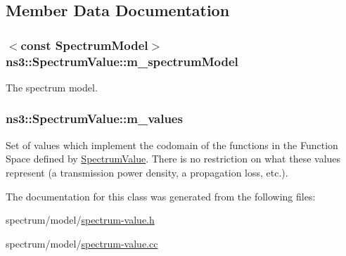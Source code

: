 \subsection{Member Data Documentation}
\subsubsection[{\texorpdfstring{m\+\_\+spectrum\+Model}{m_spectrumModel}}]{$<$const {\bf Spectrum\+Model}$>$ ns3\+::\+Spectrum\+Value\+::m\+\_\+spectrum\+Model\hspace{0.3cm}{\ttfamily [private]}}\hypertarget{classns3_1_1SpectrumValue_ab937e5d66611f1d583e631a4394d40b3}{}\label{classns3_1_1SpectrumValue_ab937e5d66611f1d583e631a4394d40b3}


The spectrum model. 

\subsubsection[{\texorpdfstring{m\+\_\+values}{m_values}}]{ ns3\+::\+Spectrum\+Value\+::m\+\_\+values\hspace{0.3cm}{\ttfamily [private]}}\hypertarget{classns3_1_1SpectrumValue_a972ea01f59adf918133fb3db7af510d1}{}\label{classns3_1_1SpectrumValue_a972ea01f59adf918133fb3db7af510d1}
Set of values which implement the codomain of the functions in the Function Space defined by \hyperlink{classns3_1_1SpectrumValue}{Spectrum\+Value}. There is no restriction on what these values represent (a transmission power density, a propagation loss, etc.). 

The documentation for this class was generated from the following files\+:\begin{DoxyCompactItemize}
\item 
spectrum/model/\hyperlink{spectrum-value_8h}{spectrum-\/value.\+h}\item 
spectrum/model/\hyperlink{spectrum-value_8cc}{spectrum-\/value.\+cc}\end{DoxyCompactItemize}
